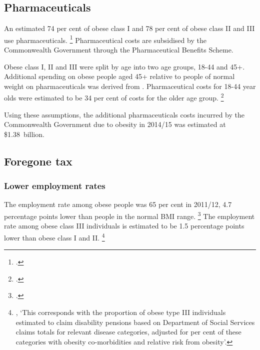 \documentclass[embargoed]{grattan}
\begin{document}
\subsection{Pharmaceuticals }\label{pharmaceuticals}

An estimated 74 per cent of obese class I and 78 per cent of obese class II and III use pharmaceuticals.%
\footcite{Buchmueller2015Obesityhealthexpenditures} Pharmaceutical costs are subsidised by the Commonwealth Government through the Pharmaceutical Benefits Scheme.

Obese class I, II and III were split by age into two age groups, 18-44 and 45+.
Additional spending on obese people aged 45+ relative to people of normal weight on pharmaceuticals was derived from \textcite{Buchmueller2015Obesityhealthexpenditures}.
Pharmaceutical costs for 18-44 year olds were estimated to be 34 per cent of costs for the older age group.%
\footcite[][50]{PwC2015Weighingcostobesity}

Using these assumptions, the additional pharmaceuticals costs incurred by the Commonwealth Government due to obesity in 2014/15 was estimated at \$1.38~billion.

\subsection{Foregone tax}\label{foregone-tax}

\subsubsection{Lower employment rates}

The employment rate among obese people was 65 per cent in 2011/12, 4.7 percentage points lower than people in the normal BMI range.%
\footcite{ABS2013436405503AustralianHealth} The employment rate among obese class III individuals is estimated to be 1.5 percentage points lower than obese class I and II.%
\footnote{\textcite[][59]{PwC2015Weighingcostobesity}, `This corresponds with the proportion of obese type III individuals estimated to claim disability pensions based on Department of Social Services claims totals for relevant disease categories, adjusted for per cent of these categories with obesity co-morbidities and relative risk from obesity'.}
\end{document}
